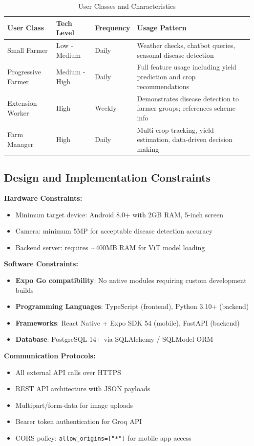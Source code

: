 \documentclass[12pt,a4paper]{article}
\newcommand{\tablefont}{\fontsize{10}{12}\selectfont}
\begin{document}
\begin{table}[H]
\centering
\tablefont
\begin{tabular}{|p{3cm}|p{2.5cm}|p{3cm}|p{3.5cm}|}
\hline
\textbf{User Class} & \textbf{Tech Level} & \textbf{Frequency} & \textbf{Usage Pattern} \\
\hline
Small Farmer & Low - Medium & Daily & Weather checks, chatbot queries, seasonal disease detection \\
Progressive Farmer & Medium - High & Daily & Full feature usage including yield prediction and crop recommendations \\
Extension Worker & High & Weekly & Demonstrates disease detection to farmer groups; references scheme info \\
Farm Manager & High & Daily & Multi-crop tracking, yield estimation, data-driven decision making \\
\hline
\end{tabular}
\caption{User Classes and Characteristics}
\end{table}

\subsection{Design and Implementation Constraints}

\textbf{Hardware Constraints:}
\begin{itemize}
    \item Minimum target device: Android 8.0+ with 2GB RAM, 5-inch screen
    \item Camera: minimum 5MP for acceptable disease detection accuracy
    \item Backend server: requires $\sim$400MB RAM for ViT model loading
\end{itemize}

\textbf{Software Constraints:}
\begin{itemize}
    \item \textbf{Expo Go compatibility}: No native modules requiring custom development builds
    \item \textbf{Programming Languages}: TypeScript (frontend), Python 3.10+ (backend)
    \item \textbf{Frameworks}: React Native + Expo SDK 54 (mobile), FastAPI (backend)
    \item \textbf{Database}: PostgreSQL 14+ via SQLAlchemy / SQLModel ORM
\end{itemize}

\textbf{Communication Protocols:}
\begin{itemize}
    \item All external API calls over HTTPS
    \item REST API architecture with JSON payloads
    \item Multipart/form-data for image uploads
    \item Bearer token authentication for Groq API
    \item CORS policy: \texttt{allow\_origins=["*"]} for mobile app access
\end{itemize}
\end{document}
